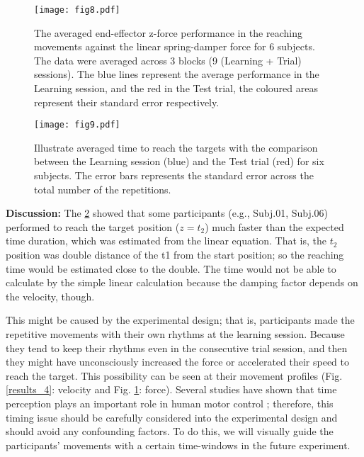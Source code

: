 \begin{figure}
	\centering
	\texttt{[image: fig8.pdf]}
	\caption{The averaged end-effector z-force performance in the reaching movements against the linear spring-damper force for 6 subjects. The data were averaged across 3 blocks (9 (Learning + Trial) sessions). The blue lines represent the average performance in the Learning session, and the red in the Test trial, the coloured areas represent their standard error respectively.}
	\label{results_5}
\end{figure}

\begin{figure}
	\centering
	\texttt{[image: fig9.pdf]}
	\caption{Illustrate averaged time to reach the targets with the comparison between the Learning session (blue) and the Test trial (red) for six	subjects. The error bars represents the standard error across the total number of the repetitions.}
	\label{results_6}
\end{figure}



\textbf{Discussion:} The \ref{results_6} showed that some participants (e.g., Subj.01, Subj.06) performed to reach the target position ($z = t_2$) much faster than the expected time duration, which was estimated from the linear equation. That is, the $t_2$ position was double distance of the t1 from the start position; so the reaching time would be estimated close to the double. The time would not be able to calculate by the simple linear calculation because the damping factor depends on the velocity, though.

This might be caused by the experimental design; that is, participants made the repetitive movements with their own rhythms at the learning session. Because they tend to keep their rhythms even in the consecutive trial session, and then they might have unconsciously increased the force or accelerated their speed to reach the target. This possibility can be seen at their movement profiles (Fig. \ref{results_4}: velocity and Fig. \ref{results_5}: force). Several studies have shown that time perception plays an important role in human motor control \cite{Berret&Jean16, Rank&DiLuca15}; therefore, this timing issue should be carefully considered into the experimental design and should avoid any confounding factors. To do this, we will visually guide the participants' movements with a certain time-windows in the future experiment.

